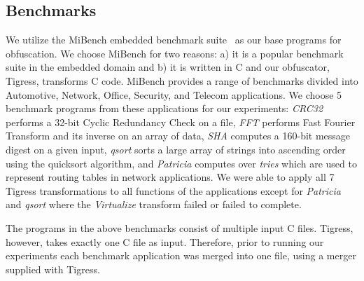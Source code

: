 \subsection{Benchmarks}
We utilize the MiBench embedded benchmark suite~\cite{guthaus2001mibench} as our base programs for obfuscation. We choose MiBench for two reasons: a) it is a popular benchmark suite in the embedded domain and b) it is written in C and our obfuscator, Tigress, transforms C code. MiBench provides a range of benchmarks divided into Automotive, Network, Office, Security, and Telecom applications. We choose 5 benchmark programs from these applications for our experiments: \textit{CRC32} performs a 32-bit Cyclic Redundancy Check on a file, \textit{FFT} performs Fast Fourier Transform and its inverse on an array of data, \textit{SHA} computes a 160-bit message digest on a given input, \textit{qsort} sorts a large array of strings into ascending order using the quicksort algorithm, and \textit{Patricia} computes over {\em tries} which are used to represent routing tables in network applications.
We were able to apply all 7 Tigress transformations to all functions of the applications except for \textit{Patricia} and \textit{qsort} where the \textit{Virtualize} transform failed or failed to complete.

The programs in the above benchmarks consist of multiple input C files. Tigress, however, takes  exactly one C file as input. Therefore, prior to running our experiments each benchmark application was merged into one file, using a merger supplied with Tigress.

